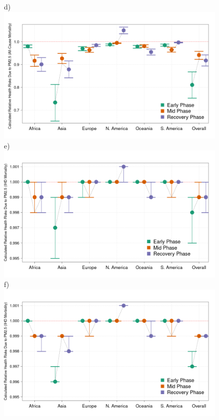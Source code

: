 \documentclass[preprint,10pt]{elsarticle} %
\begin{document}
\begin{figure}
\scriptsize{d)}\includegraphics[trim={0 0 25 23},clip,scale=0.23]{Images/pm25All_20250207.png}
\\
\scriptsize{e)}\includegraphics[trim={0 0 25 23},clip,scale=0.23]{Images/pm25Mort_20250207.png}
\scriptsize{f)}\includegraphics[trim={0 0 25 23},clip,scale=0.23]{Images/pm25Morb_20250207.png}

\end{figure}
\end{document}
